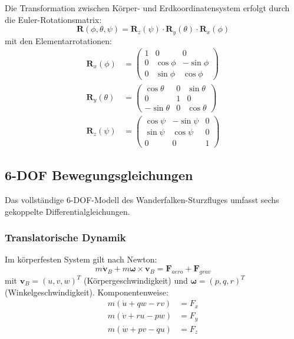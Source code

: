 ﻿\documentclass[12pt,a4paper]{article}
\theoremstyle{remark}
\begin{document}
	Die Transformation zwischen Körper- und Erdkoordinatensystem erfolgt durch die Euler-Rotationsmatrix:
	\begin{equation}
		\mathbf{R}(\phi, \theta, \psi) = \mathbf{R}_z(\psi) \cdot \mathbf{R}_y(\theta) \cdot \mathbf{R}_x(\phi)
		\label{eq:rotation}
	\end{equation}
	mit den Elementarrotationen:
	\begin{align}
		\mathbf{R}_x(\phi) &= \begin{pmatrix} 1 & 0 & 0 \\ 0 & \cos\phi & -\sin\phi \\ 0 & \sin\phi & \cos\phi \end{pmatrix} \\
		\mathbf{R}_y(\theta) &= \begin{pmatrix} \cos\theta & 0 & \sin\theta \\ 0 & 1 & 0 \\ -\sin\theta & 0 & \cos\theta \end{pmatrix} \\
		\mathbf{R}_z(\psi) &= \begin{pmatrix} \cos\psi & -\sin\psi & 0 \\ \sin\psi & \cos\psi & 0 \\ 0 & 0 & 1 \end{pmatrix}
	\end{align}
	
	\subsection{6-DOF Bewegungsgleichungen}
	
	Das vollständige 6-DOF-Modell des Wanderfalken-Sturzfluges umfasst sechs gekoppelte Differentialgleichungen.
	
	\subsubsection{Translatorische Dynamik}
	
	Im körperfesten System gilt nach Newton:
	\begin{equation}
		m \dot{\mathbf{v}}_B + m \boldsymbol{\omega} \times \mathbf{v}_B = \mathbf{F}_{aero} + \mathbf{F}_{grav}
		\label{eq:newton_trans}
	\end{equation}
	mit $\mathbf{v}_B = (u, v, w)^T$ (Körpergeschwindigkeit) und $\boldsymbol{\omega} = (p, q, r)^T$ (Winkelgeschwindigkeit). Komponentenweise:
	\begin{align}
		m(\dot{u} + qw - rv) &= F_{x} \\
		m(\dot{v} + ru - pw) &= F_{y} \\
		m(\dot{w} + pv - qu) &= F_{z}
	\end{align}
	
\end{document}
